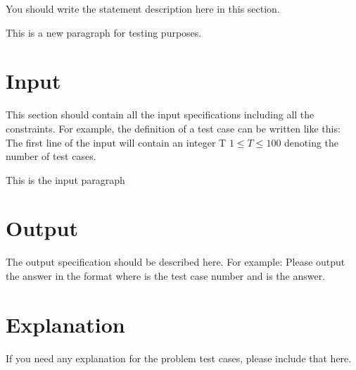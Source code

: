 You should write the statement description here in this section.

This is a new paragraph for testing purposes.

\section*{Input}

This section should contain all the input specifications including all the
constraints. For example, the definition of a test case can be written like
this: The first line of the input will contain an integer T $1 \le T \le 100$
denoting the number of test cases.

This is the input paragraph

\section*{Output}

The output specification should be described here. For example: Please
output the answer in the format  where  is the test case
number and  is the answer.

\section*{Explanation}
If you need any explanation for the problem test cases, please include
that here.